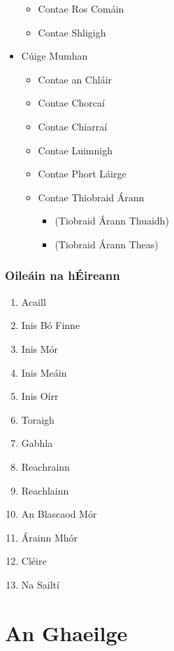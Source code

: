 \documentclass[a4paper,12pt]{article}
\theoremstyle{plain} %
\theoremstyle{definition} %
\theoremstyle{remark} %
\begin{document}
\begin{itemize}
\begin{itemize}
		\item Contae Ros Comáin
		\item Contae Shligigh
	\end{itemize}
	\item Cúige Mumhan 
	\begin{itemize}
		\item Contae an Chláir
		\item Contae Chorcaí
		\item Contae Chiarraí
		\item Contae Luimnigh
		\item Contae Phort Láirge
		\item Contae Thiobraid Árann 
		\begin{itemize}
			\item (Tiobraid Árann Thuaidh)
			\item (Tiobraid Árann Theas)
		\end{itemize}
	\end{itemize}
\end{itemize}

\subsubsection{Oileáin na hÉireann}
\begin{enumerate}
	\item Acaill
	\item Inis Bó Finne
	\item Inis Mór
	\item Inis Meáin
	\item Inis Oírr
	\item Toraigh
	\item Gabhla
	\item Reachrainn
	\item Reachlainn
	\item An Blascaod Mór
	\item Árainn Mhór
	\item Cléire
	\item Na Sailtí
\end{enumerate}

\section{An Ghaeilge}
\end{document}
